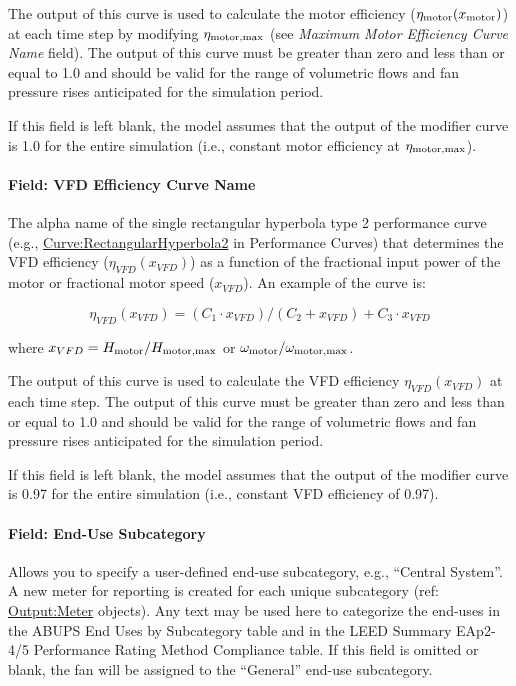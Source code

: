   The output of this curve is used to calculate the motor efficiency (\(\eta_{\rm{motor}} (x_{\rm{motor}})\)) at each time step by modifying \(\eta_{\rm{motor, max}}\) (see \emph{Maximum Motor Efficiency Curve Name} field). The output of this curve must be greater than zero and less than or equal to 1.0 and should be valid for the range of volumetric flows and fan pressure rises anticipated for the simulation period.

If this field is left blank, the model assumes that the output of the modifier curve is 1.0 for the entire simulation (i.e., constant motor efficiency at \(\eta_{\rm{motor, max}}\)).

\paragraph{Field: VFD Efficiency Curve Name}\label{field-vfd-efficiency-curve-name}

The alpha name of the single rectangular hyperbola type 2 performance curve (e.g., \hyperref[curverectangularhyperbola2]{Curve:RectangularHyperbola2} in Performance Curves) that determines the VFD efficiency (\(\eta_{VFD}(x_{VFD})\)) as a function of the fractional input power of the motor or fractional motor speed (\(x_{VFD}\)). An example of the curve is:

\begin{equation}
  \eta_{VFD}(x_{VFD}) = (C_1 \cdot x_{VFD}) / (C_2 + x_{VFD}) + C_3 \cdot x_{VFD}
\end{equation}

where \(x_{VFD} = H_{\rm{motor}} / H_{\rm{motor, max}}\) or \(\omega_{\rm{motor}} / \omega_{\rm{motor, max}}\).

The output of this curve is used to calculate the VFD efficiency \(\eta_{VFD}(x_{VFD})\) at each time step. The output of this curve must be greater than zero and less than or equal to 1.0 and should be valid for the range of volumetric flows and fan pressure rises anticipated for the simulation period.

If this field is left blank, the model assumes that the output of the modifier curve is 0.97 for the entire simulation (i.e., constant VFD efficiency of 0.97).

\paragraph{Field: End-Use Subcategory}\label{field-end-use-subcategory-4}

Allows you to specify a user-defined end-use subcategory, e.g., ``Central System''. A new meter for reporting is created for each unique subcategory (ref: \hyperref[outputmeter-and-outputmetermeterfileonly]{Output:Meter} objects). Any text may be used here to categorize the end-uses in the ABUPS End Uses by Subcategory table and in the LEED Summary EAp2-4/5 Performance Rating Method Compliance table. If this field is omitted or blank, the fan will be assigned to the ``General'' end-use subcategory.

